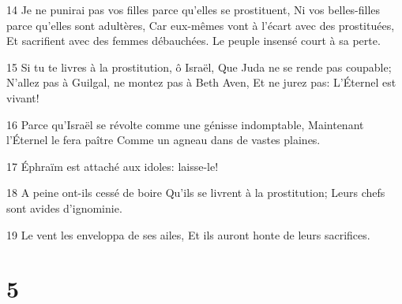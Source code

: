 \par 14 Je ne punirai pas vos filles parce qu'elles se prostituent, Ni vos belles-filles parce qu'elles sont adultères, Car eux-mêmes vont à l'écart avec des prostituées, Et sacrifient avec des femmes débauchées. Le peuple insensé court à sa perte.
\par 15 Si tu te livres à la prostitution, ô Israël, Que Juda ne se rende pas coupable; N'allez pas à Guilgal, ne montez pas à Beth Aven, Et ne jurez pas: L'Éternel est vivant!
\par 16 Parce qu'Israël se révolte comme une génisse indomptable, Maintenant l'Éternel le fera paître Comme un agneau dans de vastes plaines.
\par 17 Éphraïm est attaché aux idoles: laisse-le!
\par 18 A peine ont-ils cessé de boire Qu'ils se livrent à la prostitution; Leurs chefs sont avides d'ignominie.
\par 19 Le vent les enveloppa de ses ailes, Et ils auront honte de leurs sacrifices.

\chapter{5}

